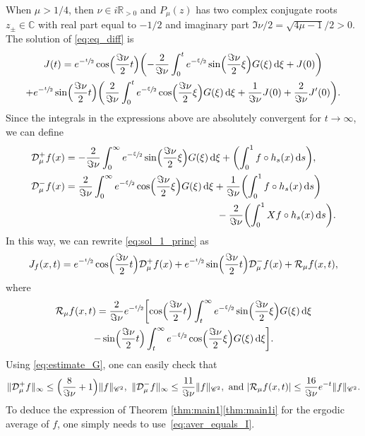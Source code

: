 \documentclass[10pt]{amsart}
\newcommand \R{\mathbb{R}}
\newcommand*{\diff}{\mathop{}\!\mathrm{d}}
\newcommand{\Dp}[1]{\mathcal{D}_\mu^{+} #1}
\newcommand{\Dm}[1]{\mathcal{D}_\mu^{-} #1}
\theoremstyle{definition}
\begin{document}
When $\mu > 1/4$, then $\nu \in i \R_{>0}$ and $P_\mu(z)$ has two complex conjugate roots $z_{\pm} \in \mathbb{C}$ with real part equal to $-1/2$ and imaginary part $\Im \nu / 2 = \sqrt{4 \mu -1} / 2 >0$.
The solution of \eqref{eq:eq_diff} is
\begin{multline}\label{eq:sol_1_princ}
J(t) = e^{-\sfrac{t}{2}} \cos\Bigl(\frac{\Im\nu}{2}t \Bigr) \biggl(- \frac{2}{\Im\nu} \int_0^t e^{-\sfrac{\xi}{2}} \sin\Bigl(\frac{\Im \nu}{2}\xi \Bigr)G(\xi) \diff \xi + J(0) \biggr) \\
+e^{-\sfrac{t}{2}} \sin\Bigl(\frac{\Im\nu}{2}t \Bigr) \biggl(\frac{2}{\Im\nu} \int_0^t e^{-\sfrac{\xi}{2}} \cos\Bigl(\frac{\Im\nu}{2}\xi \Bigr)G(\xi) \diff \xi + \frac{1}{\Im\nu} J(0) + \frac{2}{\Im\nu}J'(0) \biggr).
\end{multline}
Since the integrals in the expressions above are absolutely convergent for $t \to \infty$, we can define
\begin{equation*}
\begin{split}
\Dp{f}(x) &= - \frac{2}{\Im\nu} \int_0^\infty e^{-\sfrac{\xi}{2}} \sin\Bigl(\frac{\Im\nu}{2}\xi \Bigr)G(\xi) \diff \xi + \biggl(\int_0^1 f \circ h_s(x) \diff s \biggr),\\
\Dm{f}(x) &= \frac{2}{\Im\nu} \int_0^\infty e^{-\sfrac{\xi}{2}} \cos\Bigl(\frac{\Im\nu}{2}\xi \Bigr)G(\xi) \diff \xi + \frac{1}{\Im\nu} \biggl(\int_0^1 f \circ h_s(x) \diff s \biggr) \\
& \hspace*{5.4cm}- \frac{2}{\Im\nu}\biggl(\int_0^1 Xf \circ h_s(x) \diff s \biggr).
\end{split}
\end{equation*}
In this way, we can rewrite \eqref{eq:sol_1_princ} as
\begin{equation}\label{eq:I_mu_princ}
J_{f}(x,t) = e^{-\sfrac{t}{2}} \cos\Bigl(\frac{\Im\nu}{2}t \Bigr) \Dp{f}(x) + e^{-\sfrac{t}{2}} \sin\Bigl(\frac{\Im\nu}{2}t \Bigr) \Dm{f}(x) + \mathcal{R}_{\mu}f(x,t),
\end{equation}
where
\begin{multline*}
\mathcal{R}_{\mu}f(x,t) = \frac{2}{\Im\nu} e^{-\sfrac{t}{2}} \biggl[\cos\Bigl(\frac{\Im\nu}{2}t \Bigr) \int_t^\infty e^{-\sfrac{\xi}{2}} \sin\Bigl(\frac{\Im\nu}{2}\xi \Bigr)G(\xi) \diff \xi \\
- \sin\Bigl(\frac{\Im\nu}{2}t \Bigr) \int_t^\infty e^{-\sfrac{\xi}{2}} \cos\Bigl(\frac{\Im\nu}{2}\xi \Bigr)G(\xi) \diff \xi \biggr].
\end{multline*}
Using \eqref{eq:estimate_G}, one can easily check that
\begin{equation*}
\|\Dp{f}\|_{\infty} \leq \Bigl(\frac{8}{\Im\nu} +1 \Bigr) \|f\|_{\mathscr{C}^2}, \ \|\Dm{f}\|_{\infty} \leq \frac{11}{\Im\nu} \|f\|_{\mathscr{C}^2}, \ \text{and}\ |\mathcal{R}_\mu f(x,t) |\leq \frac{16}{\Im\nu} e^{-t}\|f\|_{\mathscr{C}^2}.
\end{equation*}
To deduce the expression of Theorem \ref{thm:main1}\eqref{thm:main1i} for the ergodic average of $f$, one simply needs to use~\eqref{eq:aver_equals_I}.
\end{document}
